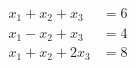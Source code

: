 \documentclass[preview]{standalone}
\begin{document}
\begin{align*} 
x_1 + x_2 + x_3 &= 6 \\ 
x_1 - x_2 + x_3 &= 4 \\ 
x_1 + x_2 + 2x_3 &= 8 
\end{align*}
\end{document}

